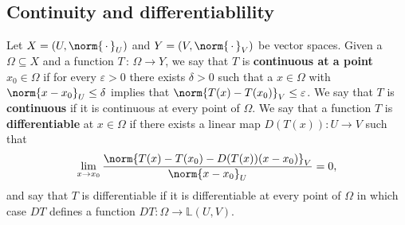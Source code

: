 \documentclass[main.tex]{subfiles}
\begin{document}
\subsection{Continuity and differentiablility}
\begin{definition}
Let $X = (U,\norm{\, \cdot \,}_U)$ and $Y = (V,\norm{\, \cdot \,}_V)$ be vector spaces. Given a $\Omega \subseteq X$ and a function $T \, : \, \Omega \rightarrow Y$, we say that $T$ is \textbf{continuous at a point $x_0 \in \Omega$} if for every $\varepsilon > 0$ there exists $\delta > 0$ such that a $x \in \Omega$ with $\norm{x - x_0}_U \leq \delta$ implies that $\norm{T(x) - T(x_0)}_V \leq \varepsilon$. We say that $T$ is \textbf{continuous} if it is continuous at every point of $\Omega$. 
We say that a function $T$ is \textbf{differentiable} at $x \in \Omega$ if there exists a linear map $D(T(x)) : U \rightarrow V$ such that 
\begin{equation}
    \lim_{x \rightarrow x_0} \frac{\norm{T(x) - T(x_0) - D(T(x))(x - x_0)}_V}{\norm{x - x_0}_U} = 0, 
\end{equation}
and say that $T$ is differentiable if it is differentiable at every point of $\Omega$ in which case $DT$ defines a function $DT:\Omega \rightarrow \mathbb{L}(U, V)$. 
\end{definition}
\end{document}
